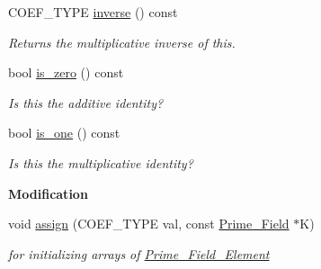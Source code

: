 \begin{Indent}
\begin{DoxyCompactItemize}
C\+O\+E\+F\+\_\+\+T\+Y\+PE \hyperlink{group___fields_group_a7e5881bb8b3f94aa8686e38e7ac78d65}{inverse} () const
\begin{DoxyCompactList}\small\item\em Returns the multiplicative inverse of {\ttfamily this}. \end{DoxyCompactList}\item 
\mbox{\label{group___fields_group_a50a94575283b1297a93eb41c22c599b2}} 
bool \hyperlink{group___fields_group_a50a94575283b1297a93eb41c22c599b2}{is\+\_\+zero} () const
\begin{DoxyCompactList}\small\item\em Is {\ttfamily this} the additive identity? \end{DoxyCompactList}\item 
\mbox{\label{group___fields_group_a69c26a37c2d6d3c996360d4f37cf6d98}} 
bool \hyperlink{group___fields_group_a69c26a37c2d6d3c996360d4f37cf6d98}{is\+\_\+one} () const
\begin{DoxyCompactList}\small\item\em Is {\ttfamily this} the multiplicative identity? \end{DoxyCompactList}\end{DoxyCompactItemize}
\end{Indent}
\begin{Indent}\textbf{ Modification}\par
\begin{DoxyCompactItemize}
\item 
\mbox{\label{group___fields_group_a5e94844996cf153ba8c9bc9b9cf518d5}} 
void \hyperlink{group___fields_group_a5e94844996cf153ba8c9bc9b9cf518d5}{assign} (C\+O\+E\+F\+\_\+\+T\+Y\+PE val, const \hyperlink{group___fields_group_class_prime___field}{Prime\+\_\+\+Field} $\ast$K)
\begin{DoxyCompactList}\small\item\em for initializing arrays of \hyperlink{group___fields_group_class_prime___field___element}{Prime\+\_\+\+Field\+\_\+\+Element} \end{DoxyCompactList}\end{DoxyCompactItemize}
\end{Indent}
